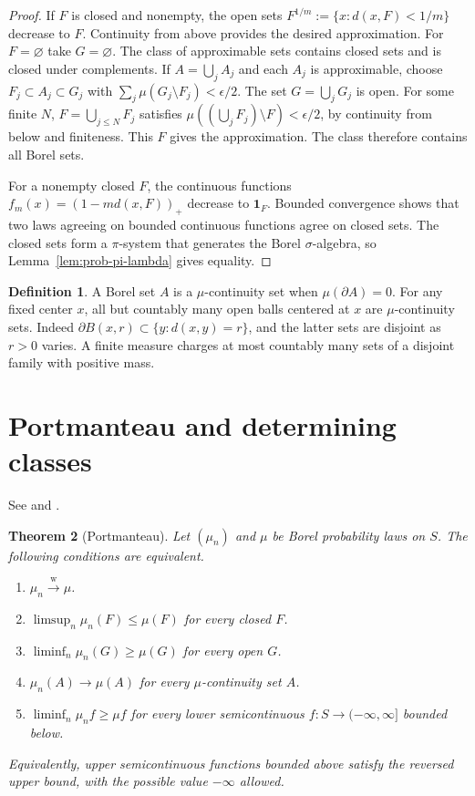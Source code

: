\documentclass[11pt,oneside,openany]{book}
\newcommand{\ind}{\mathbf{1}}
\newcommand{\weakto}{\xrightarrow{\mathrm{w}}}
\theoremstyle{plain}
\newtheorem{theorem}{Theorem}[chapter]
\theoremstyle{definition}
\newtheorem{definition}[theorem]{Definition}
\theoremstyle{remark}
\begin{document}
\begin{proof}
If \(F\) is closed and nonempty, the open sets \(F^{1/m}:=\{x:d(x,F)<1/m\}\)
decrease to \(F\). Continuity from above provides the desired approximation.
For \(F=\varnothing\) take \(G=\varnothing\). The class of approximable sets
contains closed sets and is closed under complements. If \(A=\bigcup_j A_j\)
and each \(A_j\) is approximable, choose \(F_j\subset A_j\subset G_j\) with
\(\sum_j\mu(G_j\setminus F_j)<\epsilon/2\). The set
\(G=\bigcup_j G_j\) is open. For some finite \(N\),
\(F=\bigcup_{j\le N}F_j\) satisfies
\(\mu((\bigcup_j F_j)\setminus F)<\epsilon/2\), by continuity from below
and finiteness. This \(F\) gives the approximation. The class therefore
contains all Borel sets.

For a nonempty closed \(F\), the continuous functions
\(f_m(x)=(1-m d(x,F))_+\) decrease to \(\ind_F\). Bounded convergence
shows that two laws agreeing on bounded continuous functions agree on
closed sets. The closed sets form a \(\pi\)-system that generates the
Borel \(\sigma\)-algebra, so Lemma~\ref{lem:prob-pi-lambda} gives equality.
\end{proof}

\begin{definition}
A Borel set \(A\) is a \(\mu\)-continuity set when
\(\mu(\partial A)=0\). For any fixed center \(x\), all but countably many
open balls centered at \(x\) are \(\mu\)-continuity sets. Indeed
\(\partial B(x,r)\subset\{y:d(x,y)=r\}\), and the latter sets are disjoint
as \(r>0\) varies. A finite measure charges at most countably many sets
of a disjoint family with positive mass.
\end{definition}

\section{Portmanteau and determining classes}
\label{p06-02}

See \cite[Theorems 2.1--2.4, pp.~16--19]{Billingsley} and
\cite[Theorem 5.25, pp.~116--117]{Kallenberg}.

\begin{theorem}[Portmanteau]
\label{thm:p06-portmanteau}
Let \((\mu_n)\) and \(\mu\) be Borel probability laws on \(S\).
The following conditions are equivalent.
\begin{enumerate}
\item \(\mu_n\weakto\mu\).
\item \(\limsup_n\mu_n(F)\leq\mu(F)\) for every closed \(F\).
\item \(\liminf_n\mu_n(G)\geq\mu(G)\) for every open \(G\).
\item \(\mu_n(A)\to\mu(A)\) for every \(\mu\)-continuity set \(A\).
\item \(\liminf_n \mu_n f\geq\mu f\) for every lower semicontinuous
      \(f:S\to(-\infty,\infty]\) bounded below.
\end{enumerate}
Equivalently, upper semicontinuous functions bounded above satisfy the
reversed upper bound, with the possible value \(-\infty\) allowed.
\end{theorem}
\end{document}
